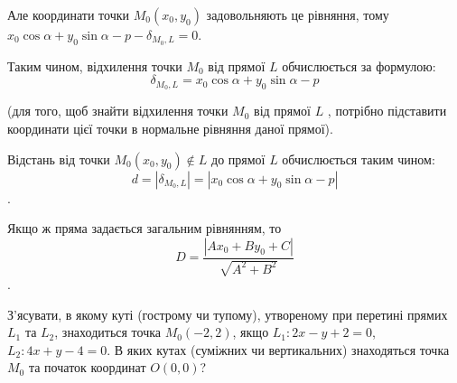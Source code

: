 Але координати точки $M_0(x_0,y_0)$ задовольняють це рівняння, тому
$x_0\cos\alpha + y_0\sin\alpha - p - \delta_{M_0,L} = 0$.

Таким чином, відхилення точки $M_0$ від прямої $L$ обчислюється за формулою:
$$\delta_{M_0,L} = x_0\cos\alpha + y_0\sin\alpha - p$$

(для того, щоб знайти відхилення точки $M_0$ від прямої $L$ , потрібно підставити
координати цієї точки в нормальне рівняння даної прямої).

Відстань від точки $M_0(x_0,y_0) \not\in L$ до прямої $L$ обчислюється таким чином:
$$d = |\delta_{M_0,L}| = |x_0\cos\alpha + y_0\sin\alpha - p|$$.

Якщо ж пряма задається загальним рівнянням, то 
$$D = \dfrac{|Ax_0 + By_0 + C|}{\sqrt{A^2 + B^2}}$$.

\begin{problem}
	З’ясувати, в якому куті (гострому чи тупому), утвореному при перетині
	прямих $L_1$ та $L_2$, знаходиться точка $M_0(-2,2)$, якщо $L_1: 2x - y + 2 = 0$, 
	$L_2: 4x + y - 4 = 0$. В яких кутах (суміжних чи вертикальних) знаходяться точка
	$M_0$ та початок координат $O(0,0)$? 
\end{problem}

